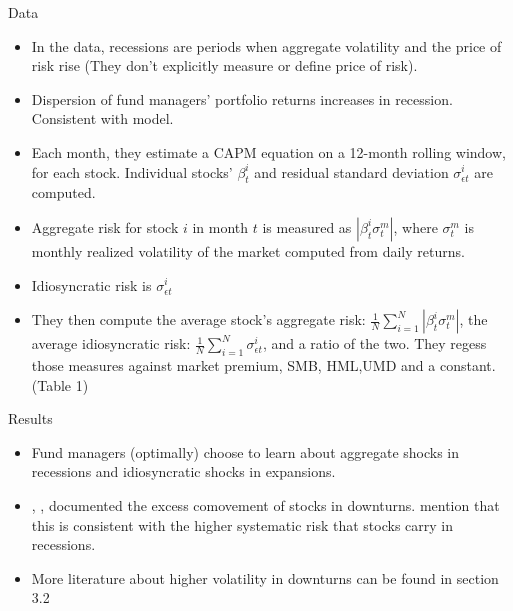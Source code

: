 Data
\begin{itemize}
    \item In the data, recessions are periods when aggregate volatility and the price of risk rise (They don't explicitly measure or define price of risk).
    \item Dispersion of fund managers' portfolio returns increases in recession. Consistent with model.
    \item Each month, they estimate a CAPM equation on a 12-month rolling window, for each stock. Individual stocks' $\beta^i_t$ and residual standard deviation $\sigma^i_{\epsilon t}$ are computed.
    \item Aggregate risk for stock $i$ in month $t$ is measured as $|\beta^i_t \sigma^m_t|$, where $\sigma^m_t$ is monthly realized volatility of the market computed from daily returns.
    \item Idiosyncratic risk is $\sigma^i_{\epsilon t}$
    \item They then compute the average stock's aggregate risk: $\frac{1}{N} \sum_{i=1}^N |\beta^i_t \sigma^m_t|$, the average idiosyncratic risk: $\frac{1}{N} \sum_{i=1}^N \sigma_{\epsilon t}^i$, and a ratio of the two. They regess those measures against market premium, SMB, HML,UMD and a constant. (Table 1)
\end{itemize}

Results
\begin{itemize}
    \item Fund managers (optimally) choose to learn about aggregate shocks in recessions and idiosyncratic shocks in expansions.
    \item \cite{Ang2002}, \cite{Ribeiro2002}, \cite{Forbes2002} documented the excess comovement of stocks in downturns. \cite{Kacperczyk2016} mention that this is consistent with the higher systematic risk that stocks carry in recessions. 
    \item More literature about higher volatility in downturns can be found in section 3.2
\end{itemize}